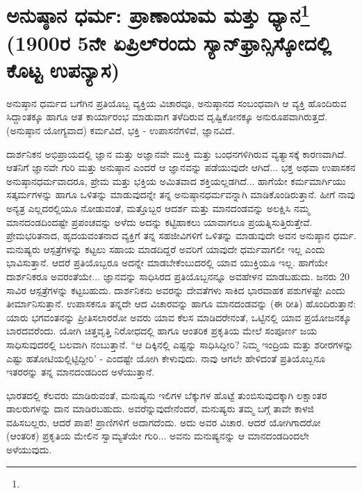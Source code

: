 
\chapter{ಅನುಷ್ಠಾನ ಧರ್ಮ: ಪ್ರಾಣಾಯಾಮ ಮತ್ತು ಧ್ಯಾನ\protect\footnote{}\\(1900ರ 5ನೇ ಏಪ್ರಿಲ್‌ರಂದು ಸ್ಯಾನ್‌ಫ್ರಾನ್ಸಿಸ್ಕೋದಲ್ಲಿ ಕೊಟ್ಟ ಉಪನ್ಯಾಸ)}

ಅನುಷ್ಠಾನ ಧರ್ಮದ ಬಗೆಗಿನ ಪ್ರತಿಯೊಬ್ಬ ವ್ಯಕ್ತಿಯ ವಿಚಾರವೂ, ಅನುಷ್ಠಾನದ ಸಂಬಂಧವಾಗಿ ಆ ವ್ಯಕ್ತಿ ಹೊಂದಿರುವ ಸಿದ್ದಾಂತಕ್ಕೂ ಹಾಗೂ ಆತ ಕಾರ್ಯಾರಂಭ ಮಾಡುವಾಗ ತಳೆದಿರುವ ದೃಷ್ಟಿಕೋನಕ್ಕೂ ಅನುರೂಪವಾಗಿರುತ್ತದೆ. (ಅನುಷ್ಠಾನ ಯೋಗ್ಯವಾದ) ಕರ್ಮವಿದೆ, ಭಕ್ತಿ - ಉಪಾಸನೆಗಳಿವೆ, ಜ್ಞಾನವಿದೆ.

ದಾರ್ಶನಿಕನ ಅಭಿಪ್ರಾಯದಲ್ಲಿ ಜ್ಞಾನ ಮತ್ತು ಅಜ್ಞಾನವೇ ಮುಕ್ತಿ ಮತ್ತು ಬಂಧನಗಳಿಗಿರುವ ವ್ಯತ್ಯಾಸಕ್ಕೆ ಕಾರಣವಾಗಿದೆ. ಆತನಿಗೆ ಜ್ಞಾನವೇ ಗುರಿ ಮತ್ತು ಅನುಷ್ಠಾನ ಎಂದರೆ ಆ ಜ್ಞಾನವನ್ನು ಪಡೆಯುವುದೇ ಆಗಿದೆ... ಭಕ್ತ ಅಥವಾ ಉಪಾಸಕನ ಅನುಷ್ಠಾನಧರ್ಮವಾದರೂ, ಪ್ರೇಮ ಮತ್ತು ಭಕ್ತಿಯ ಅಮಿತವಾದ ಶಕ್ತಿಯಲ್ಲಡಗಿದೆ... ಹಾಗೆಯೇ ಕರ್ಮಮಾರ್ಗಿಯು ಸತ್ಕರ್ಮಗಳನ್ನು ಹಾಗೂ ಒಳಿತನ್ನು ಮಾಡುವುದನ್ನೇ ತನ್ನ ಅನುಷ್ಠಾನಧರ್ಮವನ್ನಾಗಿ ಮಾಡಿಕೊಂಡಿರುತ್ತಾನೆ. ಹೀಗೆ ನಾವು ಅನ್ಯತ್ರ ಎಲ್ಲದರಲ್ಲಿಯೂ ನೋಡುವಂತೆ, ಮತ್ತೊಬ್ಬರ ಆದರ್ಶ ಮತ್ತು ಮಾನದಂಡವನ್ನು ಅಲಕ್ಷಿಸಿ ನಮ್ಮ ಮಾನದಂಡದಿಂದಷ್ಟೇ ಪ್ರಪಂಚವನ್ನು ಅಳೆದು ಅದನ್ನು ಕಟ್ಟಿಹಾಕಲು ಯಾವಾಗಲೂ ಪ್ರಯತ್ನಿಸುತ್ತಿರುತ್ತೇವೆ. ಪ್ರೇಮಭರಿತನಾದ, ಹೃದಯವಂತನಾದ ವ್ಯಕ್ತಿಗೆ ತನ್ನ ಸಹಜೀವಿಗಳಿಗೆ ಒಳಿತನ್ನು ಮಾಡುವುದೇ ಅವನ ಅನುಷ್ಠಾನ ಧರ್ಮ. ಮನುಷ್ಯರು ಆಸ್ಪತ್ರೆಗಳನ್ನು ಕಟ್ಟಲು ಸಹಾಯ ಮಾಡದಿದ್ದರೆ ಅವರಿಗೆ ಯಾವುದೇ ಧರ್ಮವಾಗಲೀ ಇಲ್ಲ ಎಂದು ಭಾವಿಸುತ್ತಾನೆ. ಆದರೆ ಪ್ರತಿಯೊಬ್ಬರೂ ಅದನ್ನೇ ಮಾಡಬೇಕೆಂಬುದರಲ್ಲಿ ಯಾವ ಯುಕ್ತಿಯೂ ಇಲ್ಲ. ಹಾಗೆಯೇ ದಾರ್ಶನಿಕರೂ ಅವರಂತೆಯೇ... ಜ್ಞಾನವನ್ನು ಸಾಧಿಸಿರದ ಪ್ರತಿಯೊಬ್ಬನನ್ನೂ ಅವಹೇಳನ ಮಾಡಬಹುದು. ಜನರು 20 ಸಾವಿರ ಆಸ್ಪತ್ರೆಗಳನ್ನು ಕಟ್ಟಬಹುದು. ದಾರ್ಶನಿಕನು ಅವರನ್ನು ದೇವತೆಗಳು ಸಾಕಿದ ಭಾರವಾಹಕ ಪಶುಗಳಷ್ಟೇ ಎಂದು ತೀರ್ಮಾನಿಸುತ್ತಾನೆ. ಉಪಾಸಕನೂ ತನ್ನದೇ ಆದ ವಿಚಾರವನ್ನು ಹಾಗೂ ಮಾನದಂಡವನ್ನು (ಈ ರೀತಿ) ಹೊಂದಿರುತ್ತಾನೆ: ಯಾರು ಭಗವಂತನನ್ನು ಪ್ರೀತಿಸಲಾರರೋ ಅವರು ಯಾವ ಕೆಲಸ ಮಾಡಿದರೇನಂತೆ, ಒಟ್ಟಿನಲ್ಲಿ ಯಾವ ಪ್ರಯೋಜನಕ್ಕೂ ಬಾರದವರೆಂದು. ಯೋಗಿ ಚಿತ್ತವೃತ್ತಿ ನಿರೋಧದಲ್ಲಿ ಹಾಗೂ ಆಂತರಿಕ ಪ್ರಕೃತಿಯ ಮೇಲೆ ಸಂಪೂರ್ಣ ಜಯ ಸಾಧಿಸುವುದರಲ್ಲಿ ಬಲವಾಗಿ ನಂಬುತ್ತಾನೆ. “ಆ ದಿಕ್ಕಿನಲ್ಲಿ ಎಷ್ಟನ್ನು ಸಾಧಿಸಿದ್ದೀರಿ? ನಿಮ್ಮ ಇಂದ್ರಿಯ ಮತ್ತು ಶರೀರಗಳನ್ನು ಎಷ್ಟು ಹತೋಟಿಯಲ್ಲಿಟ್ಟಿದ್ದೀರಿ' - ಎಂದಷ್ಟೇ ಯೋಗಿ ಕೇಳುವುದು. ನಾವು ಆಗಲೇ ಹೇಳಿದಂತೆ ಪ್ರತಿಯೊಬ್ಬನೂ ಇತರರನ್ನು ತನ್ನ ಮಾನದಂಡದಿಂದ ಅಳೆಯುತ್ತಾನೆ.

ಭಾರತದಲ್ಲಿ ಕೆಲವರು ಮಾಡಿರುವಂತೆ, ಮನುಷ್ಯನು ಇಲಿಗಳ ಬೆಕ್ಕುಗಳ ಹೊಟ್ಟೆ ತುಂಬಿಸುವುದಕ್ಕಾಗಿ ಲಕ್ಷಾಂತರ ಡಾಲರುಗಳನ್ನು ದಾನ ಮಾಡಿರಬಹುದು. ಅವರೆನ್ನುವುದೇನೆಂದರೆ, ಮನುಷ್ಯರು ತಮ್ಮ ಬಗ್ಗೆ ತಾವೇ ಕಾಳಜಿ ವಹಿಸಬಲ್ಲರು, ಆದರೆ ಪಾಪ! ಪ್ರಾಣಿಗಳಿಗೆ ಅದಾಗದೆಂದು. ಅದು ಅವರ ವಿಚಾರ. ಆದರೆ ಯೋಗಿಗಾದರೋ (ಆಂತರಿಕ) ಪ್ರಕೃತಿಯ ಮೇಲಿನ ಸ್ವಾಮ್ಯತೆಯೇ ಗುರಿ... ಅವನು ಮನುಷ್ಯನನ್ನು ಆ ಮಾನದಂಡದಿಂದಲೇ ಅಳೆಯುವುದು.

